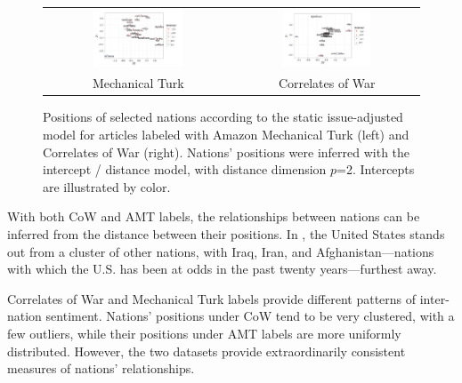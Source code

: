 \begin{figure}
  \begin{tabular}{cc}
    \includegraphics[width=0.5\textwidth]{chapter_foreign_relations/figures/011_static_positions_mturk.pdf} &
    \includegraphics[width=0.5\textwidth]{chapter_foreign_relations/figures/011_static_positions_cow.pdf}
    \\
    Mechanical Turk & Correlates of War \\
  \end{tabular}
  \caption{Positions of selected nations according to the static
    issue-adjusted model for articles labeled with Amazon Mechanical
    Turk (left) and Correlates of War (right).  Nations' positions
    were inferred with the intercept / distance model, with distance
    dimension $p$=2.  Intercepts are illustrated by color.}
  \label{fig:fr_intercept_distance_positions}
\end{figure}

With both CoW and AMT labels, the relationships between
nations can be inferred from the distance between their positions.
In , the United States stands
out from a cluster of other nations, with Iraq, Iran, and
Afghanistan---nations with which the U.S. has been at odds in the past
twenty years---furthest away.

Correlates of War and Mechanical Turk labels provide different
patterns of inter-nation sentiment.  Nations' positions under CoW
tend to be very clustered, with a few outliers, while their positions under
AMT labels are more uniformly distributed.  However, the two datasets
provide extraordinarily consistent measures of nations' relationships.

